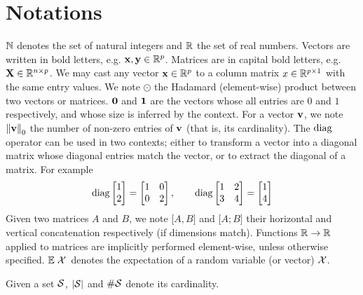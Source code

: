 \cleardoublepage
\chapter*{Notations}

$\mathbb{N}$ denotes the set of natural integers and $\mathbb{R}$ the set of real numbers.
%
Vectors are written in bold letters, e.g. $\mathbf{x}, \mathbf{y} \in \mathbb{R}^p$.
%
Matrices are in capital bold letters, e.g. $\mathbf{X} \in \mathbb{R}^{n \times p}$.
%
We may cast any vector $\mathbf{x} \in \mathbb{R}^p$ to a column matrix $x \in \mathbb{R}^{p \times 1}$ with the same entry values.
%
We note $\odot$ the Hadamard (element-wise) product between two vectors or matrices.
%
$\mathbf{0}$ and $\mathbf{1}$ are the vectors whose all entries are $0$ and $1$ respectively, and whose size is inferred by the context.
%
For a vector $\mathbf{v}$, we note $\left\lVert\mathbf{v}\right\rVert_0$ the number of non-zero entries of $\mathbf{v}$ (that is, its cardinality).
%
The $\operatorname*{diag}$ operator can be used in two contexts;
either to transform a vector into a diagonal matrix whose diagonal entries match the vector,
or to extract the diagonal of a matrix.
For example
\begin{equation*}
    \operatorname*{diag} \begin{bmatrix}
         1\\
         2
    \end{bmatrix}
    =
    \begin{bmatrix}
        1 & 0\\
        0 & 2
    \end{bmatrix}
    ,\qquad
    \operatorname*{diag} \begin{bmatrix}
        1 & 2\\
        3 & 4
    \end{bmatrix}
    =
    \begin{bmatrix}
         1\\
         4
    \end{bmatrix}
\end{equation*}
%
Given two matrices $A$ and $B$, we note $\big[ A, B \big]$ and $\big[ A; B \big]$ their horizontal and
vertical concatenation respectively (if dimensions match).
%
Functions $\mathbb{R} \to \mathbb{R}$ applied to matrices are implicitly performed element-wise, unless otherwise specified.
%
${\mathbb E}\left.\mathcal{X}\right.$ denotes the expectation of a random variable (or vector) $\mathcal{X}$.

Given a set $\mathcal{S}$, $\left\lvert\mathcal{S}\right\rvert$ and $\#\mathcal{S}$ denote its cardinality.

